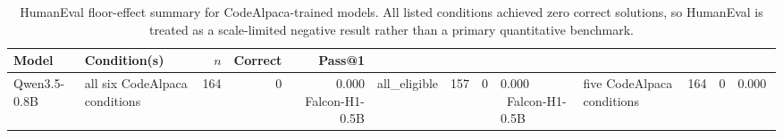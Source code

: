 \begin{table}[t]
\centering
\caption{HumanEval floor-effect summary for CodeAlpaca-trained models. All listed conditions achieved zero correct solutions, so HumanEval is treated as a scale-limited negative result rather than a primary quantitative benchmark.}
\label{tab:humaneval_floor}
\small
\begin{tabular}{@{}llrrr@{}}
\toprule
\textbf{Model} & \textbf{Condition(s)} & \textbf{$n$} & \textbf{Correct} & \textbf{Pass@1} \\
\midrule
Qwen3.5-0.8B & all six CodeAlpaca conditions & 164 & 0 & 0.000 \
Falcon-H1-0.5B & all\_eligible & 157 & 0 & 0.000 \
Falcon-H1-0.5B & five CodeAlpaca conditions & 164 & 0 & 0.000 \
\bottomrule
\end{tabular}
\end{table}